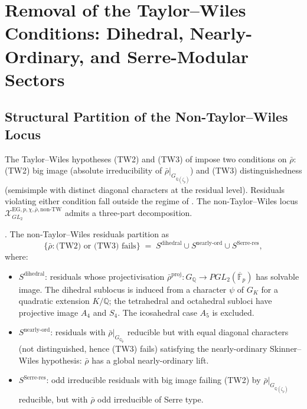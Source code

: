\section{Removal of the Taylor--Wiles Conditions: Dihedral, Nearly-Ordinary, and Serre-Modular Sectors}
\label{v4-arith:w6-e:TW-removal}

\subsection{Structural Partition of the Non-Taylor--Wiles Locus}

The Taylor--Wiles hypotheses (TW2) and (TW3) of
 impose two conditions on
\(\bar\rho\): (TW2) big image (absolute irreducibility of
\(\bar\rho|_{G_{\mathbb{Q}(\zeta_{p})}}\)) and (TW3) distinguishedness
(semisimple with distinct diagonal characters at the residual level).
Residuals violating either condition fall outside the regime of
. The non-Taylor--Wiles locus
\(\mathcal{X}^{\mathrm{EG},p,\chi,\bar\rho,\mathrm{non\text{-}TW}}_{GL_{2}}\)
admits a three-part decomposition.

\begin{definition}
\label{v4-arith:w6-e:def:non-TW-sectors}
\ClaimStatusDefinitional. The non-Taylor--Wiles residuals partition
as
\[
\{\bar\rho\colon\text{(TW2) or (TW3) fails}\}\;=\;
S^{\mathrm{dihedral}}\cup S^{\mathrm{nearly\text{-}ord}}\cup S^{\mathrm{Serre\text{-}res}},
\]
where:
\begin{itemize}
\item \(S^{\mathrm{dihedral}}\): residuals whose projectivisation
\(\bar\rho^{\mathrm{proj}}\colon G_{\mathbb{Q}}\to PGL_{2}(\overline{\mathbb{F}}_{p})\)
has solvable image. The dihedral sublocus is induced from a character
\(\psi\) of \(G_{K}\) for a quadratic extension \(K/\mathbb{Q}\); the
tetrahedral and octahedral subloci have projective image \(A_{4}\) and
\(S_{4}\). The icosahedral case \(A_{5}\) is excluded.
\item \(S^{\mathrm{nearly\text{-}ord}}\): residuals with
\(\bar\rho|_{G_{\mathbb{Q}_{p}}}\) reducible but with equal diagonal
characters (not distinguished, hence (TW3) fails) satisfying the
nearly-ordinary Skinner--Wiles hypothesis: \(\bar\rho\) has a global
nearly-ordinary lift.
\item \(S^{\mathrm{Serre\text{-}res}}\): odd irreducible residuals
with big image failing (TW2) by \(\bar\rho|_{G_{\mathbb{Q}(\zeta_{p})}}\)
reducible, but with \(\bar\rho\) odd irreducible of Serre type.
\end{itemize}
\end{definition}

